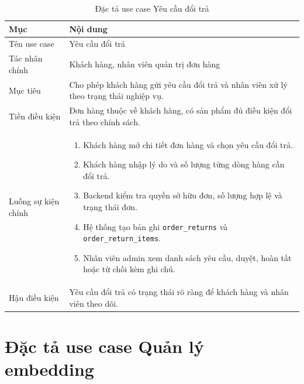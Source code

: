 \documentclass[../DoAn.tex]{subfiles}
\begin{document}
{\normalsize
\setlength{\LTleft}{\fill}
\setlength{\LTright}{\fill}
\setlength{\tabcolsep}{5pt}
\renewcommand{\arraystretch}{1.25}
\begin{longtable}{|p{3.2cm}|p{10.4cm}|}
\caption{Đặc tả use case Yêu cầu đổi trả}\\
\hline
\textbf{Mục} & \textbf{Nội dung} \\ \hline
Tên use case & Yêu cầu đổi trả \\ \hline
Tác nhân chính & Khách hàng, nhân viên quản trị đơn hàng \\ \hline
Mục tiêu & Cho phép khách hàng gửi yêu cầu đổi trả và nhân viên xử lý theo trạng thái nghiệp vụ. \\ \hline
Tiền điều kiện & Đơn hàng thuộc về khách hàng, có sản phẩm đủ điều kiện đổi trả theo chính sách. \\ \hline
Luồng sự kiện chính &
\begin{minipage}[t]{10.1cm}
\begin{enumerate}[leftmargin=*,topsep=0pt,itemsep=0pt]
    \item Khách hàng mở chi tiết đơn hàng và chọn yêu cầu đổi trả.
    \item Khách hàng nhập lý do và số lượng từng dòng hàng cần đổi trả.
    \item Backend kiểm tra quyền sở hữu đơn, số lượng hợp lệ và trạng thái đơn.
    \item Hệ thống tạo bản ghi \texttt{order\_returns} và \texttt{order\_return\_items}.
    \item Nhân viên admin xem danh sách yêu cầu, duyệt, hoàn tất hoặc từ chối kèm ghi chú.
\end{enumerate}
\end{minipage} \\ \hline
Hậu điều kiện & Yêu cầu đổi trả có trạng thái rõ ràng để khách hàng và nhân viên theo dõi. \\ \hline
\end{longtable}
}

\section{Đặc tả use case Quản lý embedding}
\label{appendix:B.4}
\end{document}
